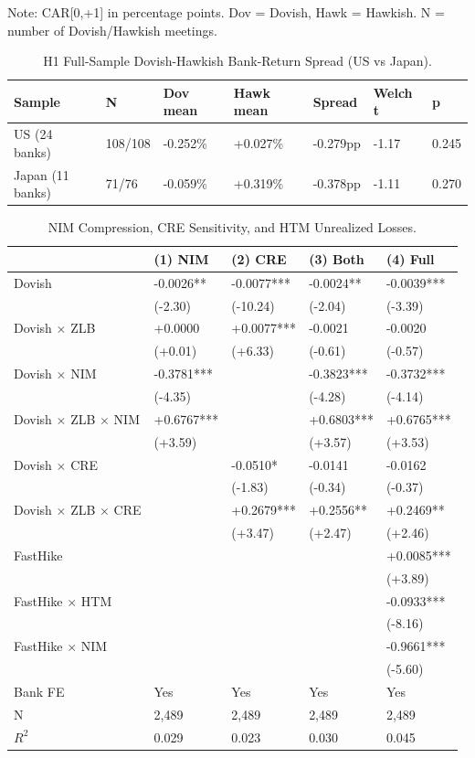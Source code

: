 \documentclass[12pt,a4paper]{article}
\begin{document}
Note: CAR[0,+1] in percentage points. Dov = Dovish, Hawk = Hawkish. N = number of Dovish/Hawkish meetings.

\begin{table}[H]
\centering
\caption{H1 Full-Sample Dovish-Hawkish Bank-Return Spread (US vs Japan).}
\label{tab:full_sample}
\small
\begin{tabular}{lllllll}
\toprule
Sample & N & Dov mean & Hawk mean & Spread & Welch t & p \\
\midrule
US (24 banks) & 108/108 & -0.252\% & +0.027\% & -0.279pp & -1.17 & 0.245 \\
Japan (11 banks) & 71/76 & -0.059\% & +0.319\% & -0.378pp & -1.11 & 0.270 \\
\bottomrule
\end{tabular}
\end{table}

\begin{table}[H]
\centering
\caption{NIM Compression, CRE Sensitivity, and HTM Unrealized Losses.}
\label{tab:channel}
\small
\begin{tabular}{lllll}
\toprule
 & (1) NIM & (2) CRE & (3) Both & (4) Full \\
\midrule
Dovish & -0.0026** & -0.0077*** & -0.0024** & -0.0039*** \\
 & (-2.30) & (-10.24) & (-2.04) & (-3.39) \\
Dovish $\times$  ZLB & +0.0000 & +0.0077*** & -0.0021 & -0.0020 \\
 & (+0.01) & (+6.33) & (-0.61) & (-0.57) \\
Dovish $\times$  NIM & -0.3781*** &  & -0.3823*** & -0.3732*** \\
 & (-4.35) &  & (-4.28) & (-4.14) \\
Dovish $\times$  ZLB $\times$  NIM & +0.6767*** &  & +0.6803*** & +0.6765*** \\
 & (+3.59) &  & (+3.57) & (+3.53) \\
Dovish $\times$  CRE &  & -0.0510* & -0.0141 & -0.0162 \\
 &  & (-1.83) & (-0.34) & (-0.37) \\
Dovish $\times$  ZLB $\times$  CRE &  & +0.2679*** & +0.2556** & +0.2469** \\
 &  & (+3.47) & (+2.47) & (+2.46) \\
FastHike &  &  &  & +0.0085*** \\
 &  &  &  & (+3.89) \\
FastHike $\times$  HTM &  &  &  & -0.0933*** \\
 &  &  &  & (-8.16) \\
FastHike $\times$  NIM &  &  &  & -0.9661*** \\
 &  &  &  & (-5.60) \\
Bank FE & Yes & Yes & Yes & Yes \\
N & 2,489 & 2,489 & 2,489 & 2,489 \\
$R^2$ & 0.029 & 0.023 & 0.030 & 0.045 \\
\bottomrule
\end{tabular}
\end{table}
\end{document}
